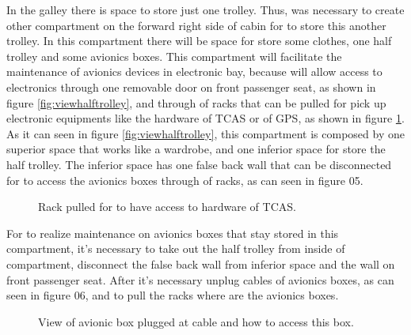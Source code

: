 In the galley there is space to store just one trolley. Thus, was necessary to create other compartment on the forward right side of cabin for to store this another trolley. In this compartment there will be space for store some clothes, one half trolley and some avionics boxes. This compartment will facilitate the maintenance of avionics devices in electronic bay, because will allow access to electronics through one removable door on front passenger seat, as shown in figure \ref{fig:viewhalftrolley}, and through of racks that can be pulled for pick up electronic equipments like the hardware of TCAS or of GPS, as shown in figure \ref{fig:MFS2}.  As it can seen in figure \ref{fig:viewhalftrolley}, this compartment is composed by one superior space that works like a wardrobe, and one inferior space for store the half trolley. The inferior space has one false back wall that can be disconnected for to access the avionics boxes through of racks, as can seen in figure 05.



\begin{figure}[H]
\caption{Rack pulled for to have access to hardware of TCAS.}
\label{fig:MFS2}
\end{figure}

For to realize maintenance on avionics boxes that stay stored in this compartment, it's necessary to take out the half trolley from inside of compartment, disconnect the false back wall from inferior space and the wall on front passenger seat. After it's necessary unplug cables of avionics boxes, as can seen in figure 06, and to pull the racks where are the avionics boxes.
\begin{figure}[H]
\caption{View of avionic box plugged at cable and how to access this box.}
\label{fig:MFS3}
\end{figure}
